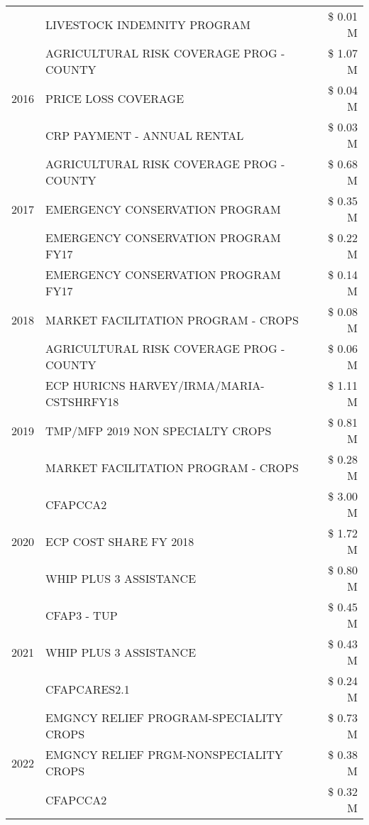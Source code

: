 \begin{tabular}{llr}
 & LIVESTOCK INDEMNITY PROGRAM & \$ 0.01 M \\
\cline{1-3}
\multirow[t]{3}{*}{2016} & AGRICULTURAL RISK COVERAGE PROG - COUNTY & \$ 1.07 M \\
 & PRICE LOSS COVERAGE & \$ 0.04 M \\
 & CRP PAYMENT - ANNUAL RENTAL & \$ 0.03 M \\
\cline{1-3}
\multirow[t]{3}{*}{2017} & AGRICULTURAL RISK COVERAGE PROG - COUNTY & \$ 0.68 M \\
 & EMERGENCY CONSERVATION PROGRAM & \$ 0.35 M \\
 & EMERGENCY CONSERVATION PROGRAM FY17 & \$ 0.22 M \\
\cline{1-3}
\multirow[t]{3}{*}{2018} & EMERGENCY CONSERVATION PROGRAM FY17 & \$ 0.14 M \\
 & MARKET FACILITATION PROGRAM - CROPS & \$ 0.08 M \\
 & AGRICULTURAL RISK COVERAGE PROG - COUNTY & \$ 0.06 M \\
\cline{1-3}
\multirow[t]{3}{*}{2019} & ECP HURICNS HARVEY/IRMA/MARIA-CSTSHRFY18 & \$ 1.11 M \\
 & TMP/MFP 2019 NON SPECIALTY CROPS & \$ 0.81 M \\
 & MARKET FACILITATION PROGRAM - CROPS & \$ 0.28 M \\
\cline{1-3}
\multirow[t]{3}{*}{2020} & CFAPCCA2 & \$ 3.00 M \\
 & ECP COST SHARE FY 2018 & \$ 1.72 M \\
 & WHIP PLUS 3 ASSISTANCE & \$ 0.80 M \\
\cline{1-3}
\multirow[t]{3}{*}{2021} & CFAP3 - TUP & \$ 0.45 M \\
 & WHIP PLUS 3 ASSISTANCE & \$ 0.43 M \\
 & CFAPCARES2.1 & \$ 0.24 M \\
\cline{1-3}
\multirow[t]{3}{*}{2022} & EMGNCY RELIEF PROGRAM-SPECIALITY CROPS & \$ 0.73 M \\
 & EMGNCY RELIEF PRGM-NONSPECIALITY CROPS & \$ 0.38 M \\
 & CFAPCCA2 & \$ 0.32 M \\
\cline{1-3}
\bottomrule
\end{tabular}
